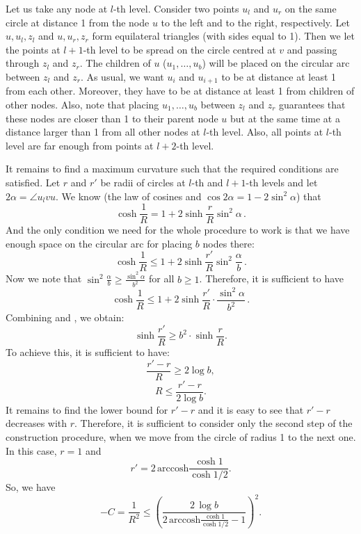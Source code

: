 \documentclass{article} %
\begin{document}
Let us take any node at $l$-th level. Consider two points $u_l$ and $u_r$ on the same circle at distance 1 from the node $u$ to the left and to the right, respectively.
Let $u,u_l,z_l$ and $u,u_r,z_r$ form equilateral triangles (with sides equal to 1). Then we let the points at $l+1$-th level to be spread on the circle centred at $v$ and passing through $z_l$ and $z_r$. The children of $u$ ($u_1, \ldots, u_{b}$) will be placed on the circular arc between $z_l$ and $z_r$. As usual, we want $u_i$ and $u_{i+1}$ to be at distance at least 1 from each other. Moreover, they have to be at distance at least 1 from children of other nodes. Also, note that placing $u_1, \ldots, u_{b}$ between $z_l$ and $z_r$ guarantees that these nodes are closer than 1 to their parent node $u$ but at the same time at a distance larger than 1 from all other nodes at $l$-th level. Also, all points at $l$-th level are far enough from points at $l+2$-th level. 

It remains to find a maximum curvature such that the required conditions are satisfied. Let $r$ and $r'$ be radii of circles at $l$-th and $l+1$-th levels and let $2\alpha = \angle u_l v u$. We know (the law of cosines and $\cos 2\alpha = 1 - 2\sin^2 \alpha$) that
\begin{equation}\label{eq:1}
\cosh \frac{1}{R} = 1 + 2 \sinh \frac{r}{R} \sin^2 \alpha \,.
\end{equation}
And the only condition we need for the whole procedure to work is that we have enough space on the circular arc for placing $b$ nodes there:
\[
\cosh \frac{1}{R} \le 1 + 2 \sinh \frac{r'}{R} \sin^2 \frac{\alpha}{b} \,.
\]
Now we note that $\sin^2 \frac{\alpha}{b} \ge \frac{\sin^2 \alpha}{b^2}$ for all $b \ge 1$. Therefore, it is sufficient to have
\begin{equation}\label{eq:2}
\cosh \frac{1}{R} \le 1 + 2 \sinh \frac{r'}{R} \cdot \frac{\sin^2 \alpha}{b^2} \,.
\end{equation}
Combining  and , we obtain:
\[
\sinh \frac{r'}{R} \ge b^2 \cdot \sinh \frac{r}{R}.
\]
To achieve this, it is sufficient to have: 
\[
\frac{r' - r}{R} \ge 2 \log b,
\]
\[
R \le \frac{r' - r}{2 \log b}.
\]
It remains to find the lower bound for $r' - r$ and it is easy to see that $r' - r$ decreases with $r$. Therefore, it is sufficient to consider only the second step of the construction procedure, when we move from the circle of radius 1 to the next one. In this case, $r = 1$ and 
\[
r' = 2 \, \mathrm{arccosh} \frac{\cosh 1}{\cosh 1/2}.
\]
So, we have 
\[
-C = \frac{1}{R^2} \le \left( \frac{2\,\log b}{2 \, \mathrm{arccosh} \frac{\cosh 1}{\cosh 1/2} - 1} \right)^2.
\]
\end{document}
